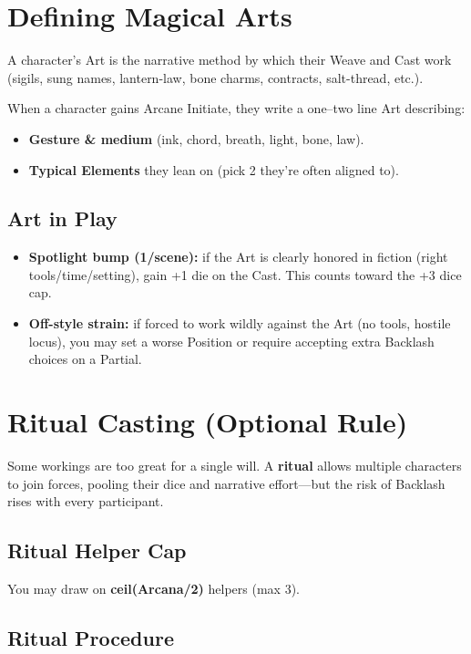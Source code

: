 \section*{Defining Magical Arts}

A character's Art is the narrative method by which their Weave and Cast work (sigils, sung names, lantern-law, bone charms, contracts, salt-thread, etc.).

When a character gains Arcane Initiate, they write a one--two line Art describing:
\begin{itemize}
    \item \textbf{Gesture \& medium} (ink, chord, breath, light, bone, law).
    \item \textbf{Typical Elements} they lean on (pick 2 they're often aligned to).
\end{itemize}

\subsection*{Art in Play}
\begin{itemize}
    \item \textbf{Spotlight bump (1/scene):} if the Art is clearly honored in fiction (right tools/time/setting), gain +1 die on the Cast. This counts toward the +3 dice cap.
    \item \textbf{Off-style strain:} if forced to work wildly against the Art (no tools, hostile locus), you may set a worse Position or require accepting extra Backlash choices on a Partial.
\end{itemize}

\section*{Ritual Casting (Optional Rule)}

Some workings are too great for a single will. A \textbf{ritual} allows multiple characters to join forces, pooling their dice and narrative effort---but the risk of Backlash rises with every participant.

\subsection*{Ritual Helper Cap}

You may draw on \textbf{ceil(Arcana/2)} helpers (max 3).

\subsection*{Ritual Procedure}

